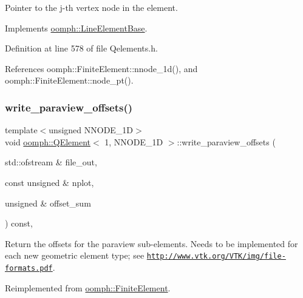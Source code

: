 Pointer to the j-\/th vertex node in the element. 



Implements \hyperlink{classoomph_1_1LineElementBase_ab878e4c4276da4cefa4302cff8a7e6f8}{oomph\+::\+Line\+Element\+Base}.



Definition at line 578 of file Qelements.\+h.



References oomph\+::\+Finite\+Element\+::nnode\+\_\+1d(), and oomph\+::\+Finite\+Element\+::node\+\_\+pt().

\mbox{\label{classoomph_1_1QElement_3_011_00_01NNODE__1D_01_4_afa1eb7a140c4150932cc39e5c7ddf4c7}} 
\subsubsection{\texorpdfstring{write\+\_\+paraview\+\_\+offsets()}{write\_paraview\_offsets()}}
{\footnotesize\ttfamily template$<$unsigned N\+N\+O\+D\+E\+\_\+1D$>$ \\
void \hyperlink{classoomph_1_1QElement}{oomph\+::\+Q\+Element}$<$ 1, N\+N\+O\+D\+E\+\_\+1D $>$\+::write\+\_\+paraview\+\_\+offsets (\begin{DoxyParamCaption}\item[{std\+::ofstream \&}]{file\+\_\+out,  }\item[{const unsigned \&}]{nplot,  }\item[{unsigned \&}]{offset\+\_\+sum }\end{DoxyParamCaption}) const\hspace{0.3cm}{\ttfamily [inline]}, {\ttfamily [virtual]}}



Return the offsets for the paraview sub-\/elements. Needs to be implemented for each new geometric element type; see \href{http://www.vtk.org/VTK/img/file-formats.pdf}{\tt http\+://www.\+vtk.\+org/\+V\+T\+K/img/file-\/formats.\+pdf}. 



Reimplemented from \hyperlink{classoomph_1_1FiniteElement_af11d35779224185e6693f2db450cc111}{oomph\+::\+Finite\+Element}.




